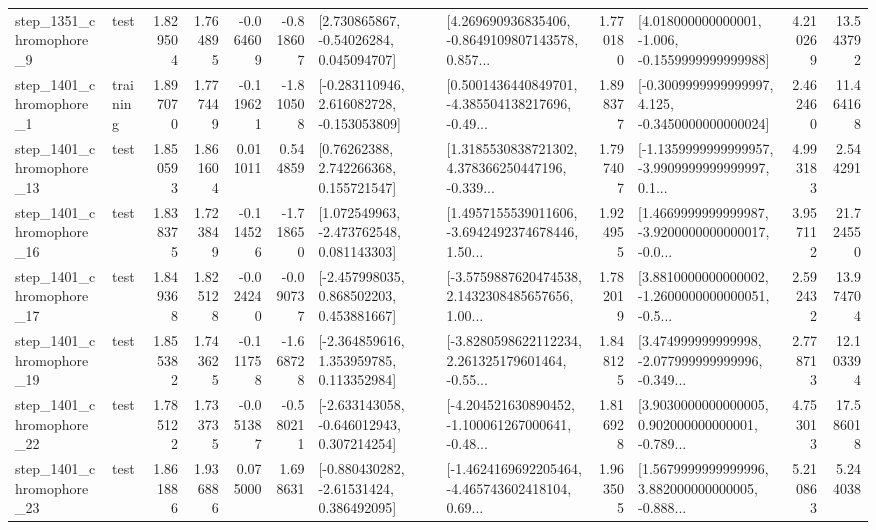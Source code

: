 \begin{tabular}{llrrrrllrlrr}
  step\_1351\_chromophore\_9 &      test &      1.829504 &    1.764895 &     -0.064609 & -0.818607 &     [2.730865867, -0.54026284, 0.045094707] &  [4.269690936835406, -0.8649109807143578, 0.857... &       1.770180 &   [4.018000000000001, -1.006, -0.1559999999999988] &            4.210269 &         13.543792 \\
  step\_1401\_chromophore\_1 &  training &      1.897070 &    1.777449 &     -0.119621 & -1.810508 &   [-0.283110946, 2.616082728, -0.153053809] &  [0.5001436440849701, -4.385504138217696, -0.49... &       1.898377 &  [-0.3009999999999997, 4.125, -0.3450000000000024] &            2.462460 &         11.464168 \\
 step\_1401\_chromophore\_13 &      test &      1.850593 &    1.861604 &      0.011011 &  0.544859 &      [0.76262388, 2.742266368, 0.155721547] &  [1.3185530838721302, 4.378366250447196, -0.339... &       1.797407 &  [-1.1359999999999957, -3.9909999999999997, 0.1... &            4.993183 &          2.544291 \\
 step\_1401\_chromophore\_16 &      test &      1.838375 &    1.723849 &     -0.114526 & -1.718650 &    [1.072549963, -2.473762548, 0.081143303] &  [1.4957155539011606, -3.6942492374678446, 1.50... &       1.924955 &  [1.4669999999999987, -3.9200000000000017, -0.0... &            3.957112 &         21.724550 \\
 step\_1401\_chromophore\_17 &      test &      1.849368 &    1.825128 &     -0.024240 & -0.090737 &    [-2.457998035, 0.868502203, 0.453881667] &  [-3.5759887620474538, 2.1432308485657656, 1.00... &       1.782019 &  [3.8810000000000002, -1.2600000000000051, -0.5... &            2.592432 &         13.974704 \\
 step\_1401\_chromophore\_19 &      test &      1.855382 &    1.743625 &     -0.111758 & -1.668728 &    [-2.364859616, 1.353959785, 0.113352984] &  [-3.8280598622112234, 2.261325179601464, -0.55... &       1.848125 &  [3.474999999999998, -2.077999999999996, -0.349... &            2.778713 &         12.103394 \\
 step\_1401\_chromophore\_22 &      test &      1.785122 &    1.733735 &     -0.051387 & -0.580211 &   [-2.633143058, -0.646012943, 0.307214254] &  [-4.204521630890452, -1.100061267000641, -0.48... &       1.816928 &  [3.9030000000000005, 0.902000000000001, -0.789... &            4.753013 &         17.586018 \\
 step\_1401\_chromophore\_23 &      test &      1.861886 &    1.936886 &      0.075000 &  1.698631 &    [-0.880430282, -2.61531424, 0.386492095] &  [-1.4624169692205464, -4.465743602418104, 0.69... &       1.963505 &  [1.5679999999999996, 3.882000000000005, -0.888... &            5.210863 &          5.244038 \\

\end{tabular}
